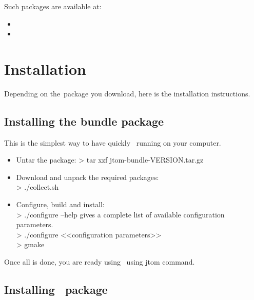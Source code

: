 
Such packages are available at:
\begin{itemize}
\item {}
\item {}
\end{itemize}    

\section{Installation}
Depending on the\TOM\ package you download, here is the installation
instructions.

\subsection{Installing the bundle package}
This is the simplest way to have quickly \TOM\ running on your
computer.
\begin{itemize}
\item Untar the package: 
  > tar xzf jtom-bundle-VERSION.tar.gz
\item Download and unpack the required packages:
  \\> ./collect.sh
\item Configure, build and install:
  \\> ./configure --help gives a complete list of available configuration parameters.
  \\> ./configure <<configuration parameters>>
  \\> gmake
\end{itemize}

Once all is done, you are ready using \TOM\ using jtom command.

\subsection{Installing \TOM\ package}

